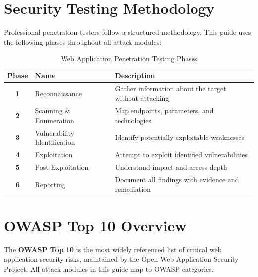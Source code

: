 
\section{Security Testing Methodology}

Professional penetration testers follow a structured methodology. This guide uses the following phases throughout all attack modules:

\begin{table}[H]
\centering
\caption{Web Application Penetration Testing Phases}
\begin{tabularx}{\textwidth}{>{\bfseries}clX}
\toprule
Phase & Name & Description \\
\midrule
1 & Reconnaissance & Gather information about the target without attacking \\
2 & Scanning \& Enumeration & Map endpoints, parameters, and technologies \\
3 & Vulnerability Identification & Identify potentially exploitable weaknesses \\
4 & Exploitation & Attempt to exploit identified vulnerabilities \\
5 & Post-Exploitation & Understand impact and access depth \\
6 & Reporting & Document all findings with evidence and remediation \\
\bottomrule
\end{tabularx}
\end{table}

\section{OWASP Top 10 Overview}
\label{sec:owasp}

The \textbf{OWASP Top 10} is the most widely referenced list of critical web application security risks, maintained by the Open Web Application Security Project. All attack modules in this guide map to OWASP categories.


